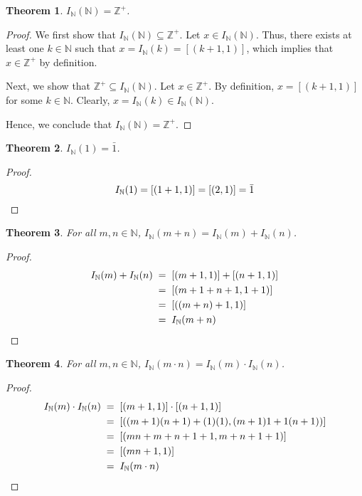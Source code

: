 \documentclass[10pt]{article}
\newtheorem{theorem}{Theorem}[section]
\theoremstyle{definition}
\theoremstyle{remark}
\newcommand{\N}{\mathbb{N}}
\newcommand{\Z}{\mathbb{Z}}
\newcommand{\IdN}{I_{\N}}
\begin{document}
        \begin{theorem}
                $\IdN(\N) = \Z^+$.
        \end{theorem}
        \begin{proof}
                We first show that $\IdN(\N) \subseteq \Z^+$.
                Let $x \in \IdN(\N)$. Thus, there exists at least one
                $k \in \N$ such that $x = \IdN(k) = [(k + 1, 1)]$, which implies that $x \in \Z^+$ by definition.

                Next, we show that $\Z^+ \subseteq \IdN(\N)$.
                Let $x \in \Z^+$. By definition, $x = [(k + 1, 1)]$ for some $k \in \N$. Clearly, $x = \IdN(k) \in \IdN(\N)$.

                Hence, we conclude that $\IdN(\N) = \Z^+$.
        \end{proof}

        \begin{theorem}
                $\IdN(1) = \bar{1}$.
        \end{theorem}
        \begin{proof}
                \[\IdN(1) = [(1 + 1, 1)] = [(2, 1)] = \bar{1} \qedhere\]
        \end{proof}

        \begin{theorem}
                For all $m, n \in \N$, $\IdN(m + n) = \IdN(m) + \IdN(n)$.
        \end{theorem}
        \begin{proof}
                \begin{align*}
                        \IdN(m) + \IdN(n) \;&=\; [(m + 1, 1)] + [(n + 1, 1)] \\
                                \;&=\; [(m + 1 + n + 1, 1 + 1)] \\
                                \;&=\; [((m + n) + 1, 1)] \\
                                \;&=\; \IdN(m + n) \qedhere
                \end{align*}
        \end{proof}

        \begin{theorem}
                For all $m, n \in \N$, $\IdN(m \cdot n) = \IdN(m) \cdot \IdN(n)$.
        \end{theorem}
        \begin{proof}
                \begin{align*}
                        \IdN(m) \cdot \IdN(n) \;&=\; [(m + 1, 1)] \cdot [(n + 1, 1)] \\
                                \;&=\; [((m + 1)(n + 1) + (1)(1), (m + 1)1 + 1(n + 1))] \\
                                \;&=\; [(mn + m + n + 1 + 1, m + n + 1 + 1)] \\
                                \;&=\; [(mn + 1, 1)] \\
                                \;&=\; \IdN(m \cdot n) \qedhere
                \end{align*}
        \end{proof}
\end{document}
